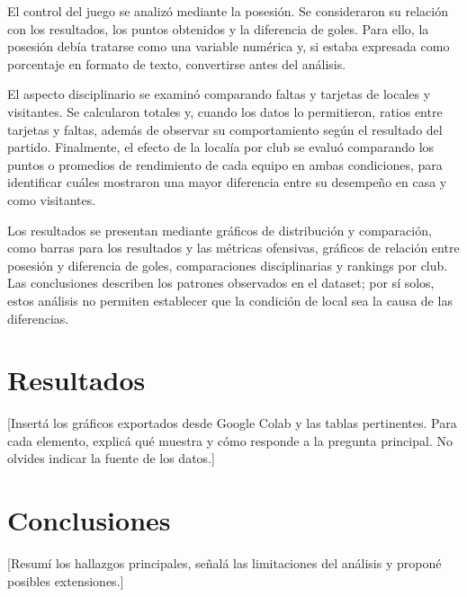 \documentclass[12pt,a4paper]{article}
\begin{document}
El control del juego se analizó mediante la posesión. Se consideraron su relación con los resultados, los puntos obtenidos y la diferencia de goles. Para ello, la posesión debía tratarse como una variable numérica y, si estaba expresada como porcentaje en formato de texto, convertirse antes del análisis.

El aspecto disciplinario se examinó comparando faltas y tarjetas de locales y visitantes. Se calcularon totales y, cuando los datos lo permitieron, ratios entre tarjetas y faltas, además de observar su comportamiento según el resultado del partido. Finalmente, el efecto de la localía por club se evaluó comparando los puntos o promedios de rendimiento de cada equipo en ambas condiciones, para identificar cuáles mostraron una mayor diferencia entre su desempeño en casa y como visitantes.

Los resultados se presentan mediante gráficos de distribución y comparación, como barras para los resultados y las métricas ofensivas, gráficos de relación entre posesión y diferencia de goles, comparaciones disciplinarias y rankings por club. Las conclusiones describen los patrones observados en el dataset; por sí solos, estos análisis no permiten establecer que la condición de local sea la causa de las diferencias.

\section{Resultados}
[Insertá los gráficos exportados desde Google Colab y las tablas pertinentes. Para cada elemento, explicá qué muestra y cómo responde a la pregunta principal. No olvides indicar la fuente de los datos.]


\section{Conclusiones}
[Resumí los hallazgos principales, señalá las limitaciones del análisis y proponé posibles extensiones.]

\end{document}
